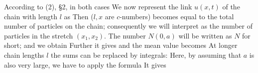 \begin{paper}{1}
According to (2), \S2, in both cases
We now represent the link $u(x,t)$ of the chain with length $l$ as
Then ($l,x$ are $c$-numbers)
becomes equal to the total number of particles on the chain; consequently we will interpret
as the number of particles in the stretch $(x_1,x_2)$. The number $N(0,a)$ will be written as $N$ for short; and we obtain
Further it gives
and the mean value becomes
At longer chain lengths $l$ the sums can be replaced by integrals:
Here, by assuming that $a$ is also very large, we have to apply the formula
It gives
\end{paper}

